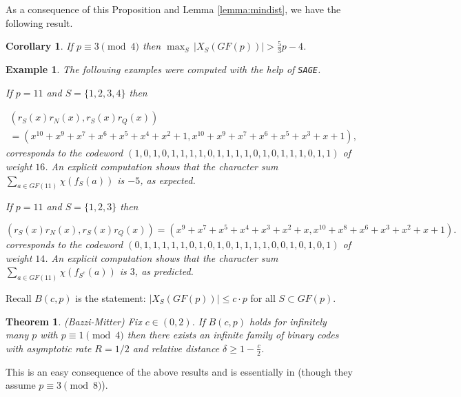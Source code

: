 \documentclass[submission%
]{dmtcs}
\newtheorem{example}{Example}
\newtheorem{theorem}{Theorem}
\newtheorem{corollary}{Corollary}
\begin{document}
As a consequence of this Proposition and Lemma \ref{lemma:mindist},
we have the following result.

\begin{corollary}
\label{cor:5/3bound}
If $p\equiv 3 \pmod 4$ then
$\max_S\, |X_S(GF(p))|>\frac{5}{3}p -4$.
\end{corollary}

\begin{example}
The following examples were computed with the help of {\tt SAGE}.

If $p=11$ and $S=\{1,2,3,4\}$ then

\[
\begin{array}{c}
(r_S(x)r_N(x),r_S(x)r_Q(x))\\
=(x^{10} + x^9 + x^7 + x^6 + x^5 + x^4 + x^2 + 1,
 x^{10} + x^9 + x^7 + x^6 + x^5 + x^3 + x + 1),
\end{array}
\]
corresponds to the codeword 
$(1, 0, 1, 0, 1, 1, 1, 1, 0, 1, 1, 1, 1, 0, 1, 0, 1, 1, 1, 0, 1, 1)$
of weight $16$. An explicit computation shows that the 
character sum $\sum_{a\in GF(11)} \chi(f_S(a))$ is
$-5$, as expected.

If $p=11$ and $S=\{1,2,3\}$ then

\[
(r_S(x)r_N(x),r_S(x)r_Q(x))
=(x^9 + x^7 + x^5 + x^4 + x^3 + x^2 + x, 
x^{10} + x^8 + x^6 + x^3 + x^2 + x + 1).
\]
corresponds to the codeword 
$(0, 1, 1, 1, 1, 1, 0, 1, 0, 1, 0, 1, 1, 1, 1, 0, 0, 1, 0, 1, 0, 1)$
of weight $14$. An explicit computation shows that the 
character sum $\sum_{a\in GF(11)} \chi(f_{S^c}(a))$ is
$3$, as predicted.

\end{example}


Recall $B(c,p)$ is the statement: 
$|X_S(GF(p))| \leq  c\cdot p$ for all $S\subset GF(p)$.

\begin{theorem}
(Bazzi-Mitter) 
Fix $c\in (0,2)$. If $B(c,p)$ holds for infinitely many $p$
with $p\equiv 1\pmod 4$
then there exists an infinite family of binary codes with asymptotic
rate $R = 1/2$ and relative distance $\delta \geq 1-\frac{c}{2}$.
\end{theorem}

This is an easy consequence of the above results and is
essentially in \cite{BM} (though they assume $p\equiv 3\pmod 8$).
\end{document}
